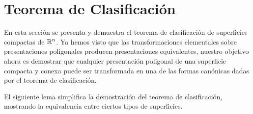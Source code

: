 

\clearpage

\section{Teorema de Clasificación}

En esta sección se presenta y demuestra el teorema de clasificación de superficies compactas de $\mathbb{R} ^n$. Ya hemos visto que las transformaciones elementales sobre presentaciones poligonales producen presentaciones equivalentes, nuestro objetivo ahora es demostrar que cualquier presentación poligonal de una superficie compacta y conexa puede ser transformada en una de las formas canónicas dadas por el teorema de clasificación.

El siguiente lema simplifica la demostración del teorema de clasificación, mostrando la equivalencia entre ciertos tipos de superficies.

